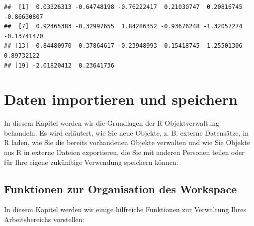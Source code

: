 \documentclass[
]{book}
\begin{document}
\begin{verbatim}
##  [1]  0.03326313 -0.64748198 -0.76222417  0.21030747  0.20816745 -0.86630807
##  [7]  0.92465383 -0.32997655  1.84286352 -0.93676248 -1.32057274 -0.13741470
## [13] -0.84480970  0.37864617 -0.23948993 -0.15418745  1.25501306  0.89732122
## [19] -2.01820412  0.23641736
\end{verbatim}

\hypertarget{daten-importieren-und-speichern}{%
\chapter{Daten importieren und speichern}\label{daten-importieren-und-speichern}}

In diesem Kapitel werden wir die Grundlagen der R-Objektverwaltung behandeln. Es wird erläutert, wie Sie neue Objekte, z. B. externe Datensätze, in R laden, wie Sie die bereits vorhandenen Objekte verwalten und wie Sie Objekte aus R in externe Dateien exportieren, die Sie mit anderen Personen teilen oder für Ihre eigene zukünftige Verwendung speichern können.

\hypertarget{funktionen-zur-organisation-des-workspace}{%
\section{Funktionen zur Organisation des Workspace}\label{funktionen-zur-organisation-des-workspace}}

In diesem Kapitel werden wir einige hilfreiche Funktionen zur Verwaltung Ihres Arbeitsbereichs vorstellen:
\end{document}

